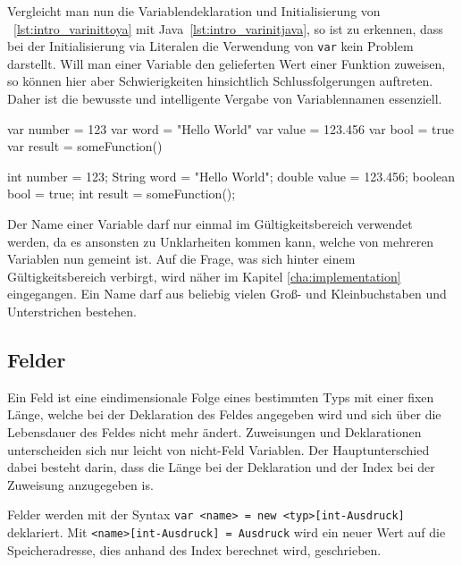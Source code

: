 Vergleicht man nun die Variablendeklaration und Initialisierung von \toya~\ref{lst:intro_varinittoya} mit Java~\ref{lst:intro_varinitjava}, so ist zu erkennen, dass bei der Initialisierung via Literalen die Verwendung von \texttt{var} kein Problem darstellt. Will man einer Variable den gelieferten Wert einer Funktion zuweisen, so können hier aber Schwierigkeiten hinsichtlich Schlussfolgerungen auftreten. Daher ist die bewusste und intelligente Vergabe von Variablennamen essenziell.

\begin{ToyaCode}[numbers=none, caption={Variablendeklaration in toya}, label=lst:intro_varinittoya]
var number = 123
var word = "Hello World"
var value = 123.456
var bool = true
var result = someFunction()
\end{ToyaCode}

\begin{JavaCode}[numbers=none,caption={Variablendeklaration in Java (vor Version 10)}, label=lst:intro_varinitjava]
int number = 123;
String word = "Hello World";
double value = 123.456;
boolean bool = true;
int result = someFunction();
\end{JavaCode}

Der Name einer Variable darf nur einmal im Gültigkeitsbereich verwendet werden, da es ansonsten zu Unklarheiten kommen kann, welche von mehreren Variablen nun gemeint ist. Auf die Frage, was sich hinter einem Gültigkeitsbereich verbirgt, wird näher im Kapitel \ref{cha:implementation} eingegangen. Ein Name darf aus beliebig vielen Groß- und Kleinbuchstaben und Unterstrichen bestehen.

\subsection{Felder}

Ein Feld ist eine eindimensionale Folge eines bestimmten Typs mit einer fixen Länge, welche bei der Deklaration des Feldes angegeben wird und sich über die Lebensdauer des Feldes nicht mehr ändert. Zuweisungen und Deklarationen unterscheiden sich nur leicht von nicht-Feld Variablen. Der Hauptunterschied dabei besteht darin, dass die Länge bei der Deklaration und der Index bei der Zuweisung anzugegeben is.

Felder werden mit der Syntax \texttt{var <name> = new <typ>[int-Ausdruck]} deklariert. Mit \texttt{<name>[int-Ausdruck] = Ausdruck} wird ein neuer Wert auf die Speicheradresse, dies anhand des Index berechnet wird, geschrieben.

